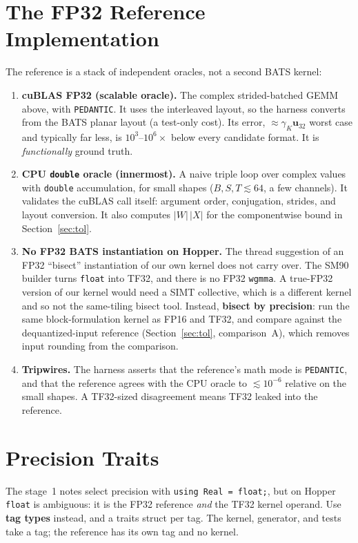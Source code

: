 \documentclass[10pt,letterpaper]{article}
\newcommand{\ur}{\mathbf{u}}
\begin{document}
\section{The FP32 Reference Implementation}

The reference is a stack of independent oracles, not a second BATS kernel:
\begin{enumerate}
  \item \textbf{cuBLAS FP32 (scalable oracle).} The complex strided-batched GEMM above, with \texttt{PEDANTIC}. It uses the interleaved layout, so the harness converts from the BATS planar layout (a test-only cost). Its error, $\approx \gamma_K \ur_{32}$ worst case and typically far less, is $10^3$--$10^6\times$ below every candidate format. It is \emph{functionally} ground truth.
  \item \textbf{CPU \texttt{double} oracle (innermost).} A naive triple loop over complex values with \texttt{double} accumulation, for small shapes ($B, S, T \lesssim 64$, a few channels). It validates the cuBLAS call itself: argument order, conjugation, strides, and layout conversion. It also computes $|W|\,|X|$ for the componentwise bound in Section~\ref{sec:tol}.
  \item \textbf{No FP32 BATS instantiation on Hopper.} The thread suggestion of an FP32 ``bisect'' instantiation of our own kernel does not carry over. The SM90 builder turns \texttt{float} into TF32, and there is no FP32 \texttt{wgmma}. A true-FP32 version of our kernel would need a SIMT collective, which is a different kernel and so not the same-tiling bisect tool. Instead, \textbf{bisect by precision}: run the same block-formulation kernel as FP16 and TF32, and compare against the dequantized-input reference (Section~\ref{sec:tol}, comparison~A), which removes input rounding from the comparison.
  \item \textbf{Tripwires.} The harness asserts that the reference's math mode is \texttt{PEDANTIC}, and that the reference agrees with the CPU oracle to $\lesssim 10^{-6}$ relative on the small shapes. A TF32-sized disagreement means TF32 leaked into the reference.
\end{enumerate}

\section{Precision Traits}

The stage~1 notes select precision with \texttt{using Real = float;}, but on Hopper \texttt{float} is ambiguous: it is the FP32 reference \emph{and} the TF32 kernel operand. Use \textbf{tag types} instead, and a traits struct per tag. The kernel, generator, and tests take a tag; the reference has its own tag and no kernel.
\end{document}
